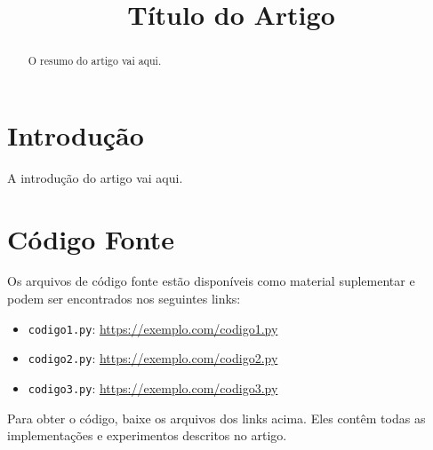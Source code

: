 \documentclass[conference]{IEEEtran}
\begin{document}
\title{Título do Artigo}
\author{
}

\maketitle

\begin{abstract}
O resumo do artigo vai aqui.
\end{abstract}

\section{Introdução}
A introdução do artigo vai aqui.


\appendices
\section{Código Fonte}

Os arquivos de código fonte estão disponíveis como material suplementar e podem ser encontrados nos seguintes links:

\begin{itemize}
    \item \texttt{codigo1.py}: \url{https://exemplo.com/codigo1.py}
    \item \texttt{codigo2.py}: \url{https://exemplo.com/codigo2.py}
    \item \texttt{codigo3.py}: \url{https://exemplo.com/codigo3.py}
\end{itemize}

Para obter o código, baixe os arquivos dos links acima. Eles contêm todas as implementações e experimentos descritos no artigo.
\end{document}
